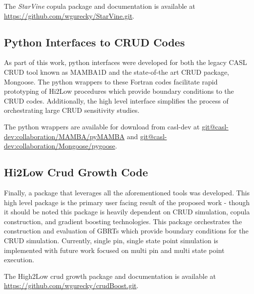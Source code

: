 The \emph{StarVine} copula package and documentation is available at \url{https://github.com/wgurecky/StarVine.git}.

\subsection{Python Interfaces to CRUD Codes}

As part of this work, python interfaces were developed for both the legacy CASL CRUD tool known as MAMBA1D and the state-of-the art CRUD package, Mongoose.  The python wrappers to these Fortran codes facilitate rapid prototyping of Hi2Low procedures which provide boundary conditions to the CRUD codes.  Additionally, the high level interface simplifies the process of orchestrating large CRUD sensitivity studies.

The python wrappers are available for download from casl-dev at \url{git@casl-dev:collaboration/MAMBA/pyMAMBA} and \url{git@casl-dev:collaboration/Mongoose/pygoose}.

\subsection{Hi2Low Crud Growth Code}

Finally, a package that leverages all the aforementioned tools was developed.  This high level package is the primary user facing result of the proposed work - though it should be noted this package is heavily dependent on CRUD simulation, copula construction, and gradient boosting technologies.
This package orchestrates the construction and evaluation of GBRTs which provide boundary conditions for the CRUD simulation.
Currently, single pin, single state point simulation is implemented with future work focused on multi pin and multi state point execution.

The High2Low crud growth package and documentation is available at \url{https://github.com/wgurecky/crudBoost.git}.
